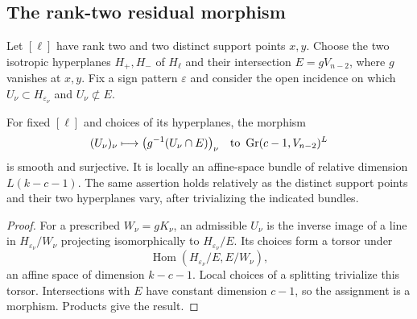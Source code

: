 \subsection{The rank-two residual morphism}
Let $[\ell]$ have rank two and two distinct support points $x,y$.
Choose the two isotropic hyperplanes $H_+,H_-$ of $H_\ell$ and their
intersection $E=gV_{n-2}$, where $g$ vanishes at $x,y$.
Fix a sign pattern $\varepsilon$ and consider the open incidence on which
$U_\nu\subset H_{\varepsilon_\nu}$ and $U_\nu\not\subset E$.
\begin{proposition}\label{prop:residual-dominance}
For fixed $[\ell]$ and choices of its hyperplanes, the morphism
\begin{equation}\label{eq:residual-morphism}
 (U_\nu)_\nu\longmapsto
 \bigl(g^{-1}(U_\nu\cap E)\bigr)_\nu
 \quad\hbox{to }\operatorname{Gr}(c-1,V_{n-2})^L
\end{equation}
is smooth and surjective. It is locally an affine-space bundle of
relative dimension $L(k-c-1)$.
The same assertion holds relatively as the distinct support points and
their two hyperplanes vary, after trivializing the indicated bundles.
\end{proposition}
\begin{proof}
For a prescribed $W_\nu=gK_\nu$, an admissible $U_\nu$ is the inverse
image of a line in $H_{\varepsilon_\nu}/W_\nu$ projecting isomorphically
to $H_{\varepsilon_\nu}/E$. Its choices form a torsor under
\[
 \operatorname{Hom}(H_{\varepsilon_\nu}/E,E/W_\nu),
\]
an affine space of dimension $k-c-1$. Local choices of a splitting
trivialize this torsor. Intersections with $E$ have constant dimension
$c-1$, so the assignment is a morphism. Products give the result.
\end{proof}

